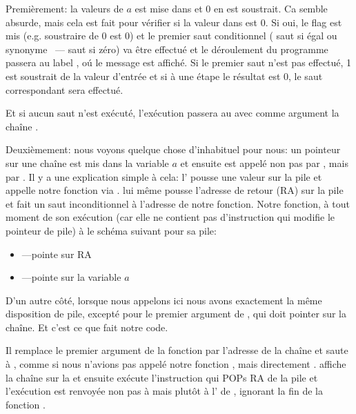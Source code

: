 
Premièrement: la valeurs de $a$ est mise dans \EAX et 0 en est soustrait. Ca semble
absurde, mais cela est fait pour vérifier si la valeur dans \EAX est 0. Si oui, le
flag \ZF est mis (e.g. soustraire de 0 est 0) et le premier saut conditionnel \JE
( saut si égal ou synonyme \JZ~--- saut si zéro)
va être effectué et le déroulement du programme passera au label , oú
le message  est affiché.
Si le premier saut n'est pas effectué, 1 est soustrait de la valeur d'entrée et si
à une étape le résultat est 0, le saut correspondant sera effectué.

Et si aucun saut n'est exécuté, l'exécution passera au \printf avec comme argument
la chaîne .

\label{jump_to_last_printf}
\myindex{\Stack}

Deuxièmement: nous voyons quelque chose d'inhabituel pour nous: un pointeur sur une
chaîne est mis dans la variable $a$ et ensuite \printf est appelé non pas par \CALL,
mais par \JMP. Il y a une explication simple à cela: l'
pousse une valeur sur la pile et appelle notre fonction via \CALL.
\CALL lui même pousse l'adresse de retour (\ac{RA}) sur la pile et fait un saut
inconditionnel à l'adresse de notre fonction.
Notre fonction, à tout moment de son exécution (car elle ne contient pas d'instruction
qui modifie le pointeur de pile) à le schéma suivant pour sa pile:

\begin{itemize}
\item\ESP---pointe sur \ac{RA}
\item{}---pointe sur la variable $a$
\end{itemize}

D'un autre côté, lorsque nous appelons \printf ici nous avons exactement la même
disposition de pile, excepté pour le premier argument de \printf, qui doit pointer
sur la chaîne. Et c'est ce que fait notre code.

Il remplace le premier argument de la fonction par l'adresse de la chaîne et saute
à \printf, comme si nous n'avions pas appelé notre fonction \ttf, mais directement
\printf.
\printf affiche la chaîne sur la  et ensuite exécute
l'instruction \RET qui POPs \ac{RA} de la pile et l'exécution est renvoyée non pas
à \ttf mais plutôt à l' de \ttf, ignorant la fin de la
fonction \ttf.

